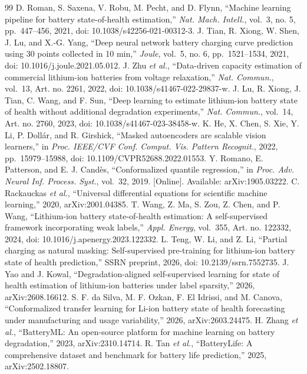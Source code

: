 \documentclass[journal]{IEEEtran}
\begin{document}
\begin{thebibliography}{99}
 D. Roman, S. Saxena, V. Robu, M. Pecht, and D. Flynn, ``Machine learning pipeline for battery state-of-health estimation,'' \emph{Nat. Mach. Intell.}, vol.~3, no. 5, pp.~447--456, 2021, doi: 10.1038/s42256-021-00312-3.
 J. Tian, R. Xiong, W. Shen, J. Lu, and X.-G. Yang, ``Deep neural network battery charging curve prediction using 30 points collected in 10 min,'' \emph{Joule}, vol.~5, no. 6, pp.~1521--1534, 2021, doi: 10.1016/j.joule.2021.05.012.
 J. Zhu \emph{et al.}, ``Data-driven capacity estimation of commercial lithium-ion batteries from voltage relaxation,'' \emph{Nat. Commun.}, vol.~13, Art. no. 2261, 2022, doi: 10.1038/s41467-022-29837-w.
 J. Lu, R. Xiong, J. Tian, C. Wang, and F. Sun, ``Deep learning to estimate lithium-ion battery state of health without additional degradation experiments,'' \emph{Nat. Commun.}, vol.~14, Art. no. 2760, 2023, doi: 10.1038/s41467-023-38458-w.
 K. He, X. Chen, S. Xie, Y. Li, P. Doll\'ar, and R. Girshick, ``Masked autoencoders are scalable vision learners,'' in \emph{Proc. IEEE/CVF Conf. Comput. Vis. Pattern Recognit.}, 2022, pp.~15979--15988, doi: 10.1109/CVPR52688.2022.01553.
 Y. Romano, E. Patterson, and E. J. Cand\`es, ``Conformalized quantile regression,'' in \emph{Proc. Adv. Neural Inf. Process. Syst.}, vol.~32, 2019. {[}Online{]}. Available: arXiv:1905.03222.
 C. Rackauckas \emph{et al.}, ``Universal differential equations for scientific machine learning,'' 2020, arXiv:2001.04385.
 T. Wang, Z. Ma, S. Zou, Z. Chen, and P. Wang, ``Lithium-ion battery state-of-health estimation: A self-supervised framework incorporating weak labels,'' \emph{Appl. Energy}, vol.~355, Art. no. 122332, 2024, doi: 10.1016/j.apenergy.2023.122332.
 L. Teng, W. Li, and Z. Li, ``Partial charging as natural masking: Self-supervised pre-training for lithium-ion battery state of health prediction,'' SSRN preprint, 2026, doi: 10.2139/ssrn.7552735.
 J. Yao and J. Kowal, ``Degradation-aligned self-supervised learning for state of health estimation of lithium-ion batteries under label sparsity,'' 2026, arXiv:2608.16612.
 S. F. da Silva, M. F. Ozkan, F. El Idrissi, and M. Canova, ``Conformalized transfer learning for Li-ion battery state of health forecasting under manufacturing and usage variability,'' 2026, arXiv:2603.24475.
 H. Zhang \emph{et al.}, ``BatteryML: An open-source platform for machine learning on battery degradation,'' 2023, arXiv:2310.14714.
 R. Tan \emph{et al.}, ``BatteryLife: A comprehensive dataset and benchmark for battery life prediction,'' 2025, arXiv:2502.18807.

\end{thebibliography}
\end{document}
